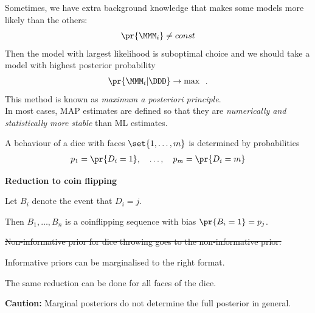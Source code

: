 \documentclass[landscape,footrule]{foils}
\begin{document}
Sometimes, we have extra background knowledge that makes some models
more likely than the others:
\begin{align*}
  \pr{\MMM_i}\neq const
\end{align*}
Then the model with largest likelihood is suboptimal choice and we
should take a model with highest posterior probability
\begin{align*}
  \pr{\MMM_i|\DDD}\to\max\enspace.
\end{align*}
This method is known as \emph{maximum a posteriori principle}.\\

In most cases, MAP estimates are defined so that they are
\emph{numerically and statistically more stable} than ML estimates.




A behaviour of a dice with faces $\set{1,\ldots,m}$ is determined by probabilities 
\begin{align*}
p_1=\pr{D_i=1},\quad\ldots,\quad p_m=\pr{D_i=m}
\end{align*}

\textbf{Reduction to coin flipping} 
\begin{triangles}
\item Let $B_i$ denote the event that $D_i=j$.
\item Then $B_1,\ldots, B_n$ is a coinflipping sequence with bias $\pr{B_i=1}=p_j$.
\item \colorbox{black!20}{\st{Non-informative prior for dice throwing goes to the non-informative prior.}}
\item Informative priors can be marginalised to the right format.
\item The same reduction can be done for all faces of the dice.    
\end{triangles} 
\vspace*{1cm}

\textbf{Caution:} Marginal posteriors do not determine the full posterior in general.

\end{document}
